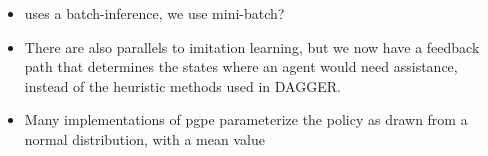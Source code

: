 \begin{itemize}
         \item \cite{doshi2016hidden} uses a batch-inference, we use mini-batch?

         \item There are also parallels to imitation learning, but we now have a feedback path that determines the
             states where an agent would need assistance, instead of the heuristic methods used in DAGGER.

         \item Many implementations of \ac{pgpe} parameterize the policy as drawn from a normal distribution, with a
             mean value

    \end{itemize}


